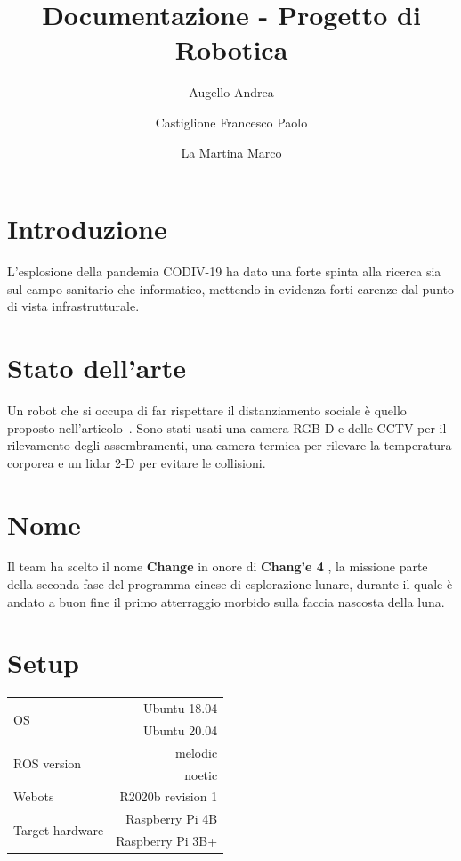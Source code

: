 \documentclass[a4paper]{article}
\begin{document}
	\title{Documentazione - Progetto di Robotica}
	\author{Augello Andrea \and Castiglione Francesco Paolo \and La Martina Marco}
	\maketitle
	\tableofcontents


	\section{Introduzione}\label{sec:Introduzione}
	L'esplosione della pandemia CODIV-19 ha dato una forte spinta alla ricerca sia sul campo sanitario che informatico, mettendo in evidenza forti carenze dal punto di vista infrastrutturale.
	
	\section{Stato dell'arte}\label{sec:Stato-dell-arte}
	Un robot che si occupa di far rispettare il distanziamento sociale è quello proposto nell'articolo~\cite{sathyamoorthy2020covidrobot}. Sono stati usati una camera RGB-D e delle CCTV per il rilevamento degli assembramenti, una camera termica per rilevare la temperatura corporea e un lidar 2-D per evitare le collisioni.
	
	\section{Nome}\label{sec:Nome}
	Il team ha scelto il nome \textbf{Change} in onore di \textbf{Chang'e 4} \cite{change4}, la missione parte della seconda fase del programma cinese di esplorazione lunare, durante il quale è andato a buon fine il primo atterraggio morbido sulla faccia nascosta della luna. 
	
	\section{Setup}\label{sec:Setup}
	\begin{tabular}{|l|r|}
		\hline
		\multirow{2}{4em}{OS} & Ubuntu 18.04 \\
							  & Ubuntu 20.04 \\ \hline
		\multirow{2}{6em}{ROS version} & melodic \\
									   & noetic \\ \hline
		Webots & R2020b revision 1\\ \hline
		\multirow{2}{11em}{Target hardware} & Raspberry Pi 4B \\
											& Raspberry Pi 3B+ \\ \hline
	\end{tabular}
\end{document}

